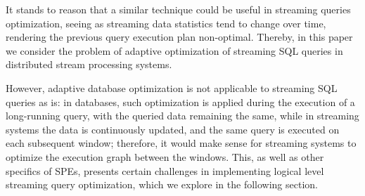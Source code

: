It stands to reason that a similar technique could be useful in streaming queries optimization, seeing as streaming data statistics tend to change over time, rendering the previous query execution plan non-optimal. Thereby, in this paper we consider the problem of adaptive optimization of streaming SQL queries in distributed stream processing systems. 


However, adaptive database optimization is not applicable to streaming SQL queries as is: in databases, such optimization is applied during the execution of a long-running query, with the queried data remaining the same, while in streaming systems the data is continuously updated, and the same query is executed on each subsequent window; therefore, it would make sense for streaming systems to optimize the execution graph between the windows. This, as well as other specifics of SPEs, presents certain challenges in implementing logical level streaming query optimization, which we explore in the following section.

